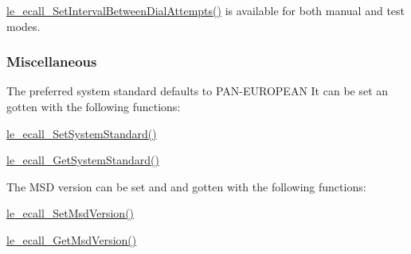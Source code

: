 \hyperlink{le__ecall__interface_8h_af90a8602d4b1d0cacaa3971c508dd188}{le\+\_\+ecall\+\_\+\+Set\+Interval\+Between\+Dial\+Attempts()} is available for both manual and test modes.\hypertarget{c_SDD_eCall_le_ecall_configuration_misc}{}\subsubsection{Miscellaneous}\label{c_SDD_eCall_le_ecall_configuration_misc}
The preferred system standard defaults to P\+A\+N-\/\+E\+U\+R\+O\+P\+E\+AN It can be set an gotten with the following functions\+:
\begin{DoxyItemize}
\item \hyperlink{le__ecall__interface_8h_a1b492b42490b319fcc228e52f8694307}{le\+\_\+ecall\+\_\+\+Set\+System\+Standard()}
\item \hyperlink{le__ecall__interface_8h_abfb468cf1e977e9b2444d13617322331}{le\+\_\+ecall\+\_\+\+Get\+System\+Standard()}
\end{DoxyItemize}


 The M\+SD version can be set and and gotten with the following functions\+:
\begin{DoxyItemize}
\item \hyperlink{le__ecall__interface_8h_a4d698cd7bde3b33e191453d31bc7c9d1}{le\+\_\+ecall\+\_\+\+Set\+Msd\+Version()}
\item \hyperlink{le__ecall__interface_8h_a4875975bc3f3c8fb78b43ae40322eedd}{le\+\_\+ecall\+\_\+\+Get\+Msd\+Version()}
\end{DoxyItemize}


